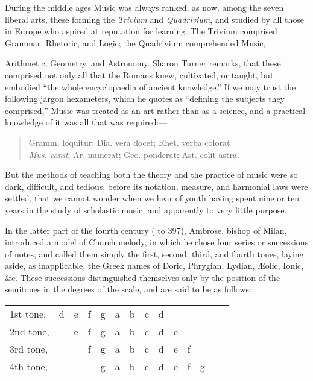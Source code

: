 

During the middle ages Music was always ranked, as now, among the seven
liberal arts, these forming the \textit{Trivium} and \textit{Quadrivium}, and studied by all
those in Europe who aspired at reputation for learning. The Trivium comprised
Grammar, Rhetoric, and Logic; the
\pagebreak
Quadrivium comprehended Music,
Arithmetic, Geometry, and Astronomy. Sharon Turner remarks, that these 
comprised not only all that the Romans knew, cultivated, or taught, but
embodied “the whole encyclopaedia of ancient knowledge.” If we may trust
the following jargon hexameters, which he quotes as “defining the subjects
they comprised,” Music was treated as an art rather than as a science, and
a practical knowledge of it was all that was required:—

\begin{quotation}
\noindent Gramm, loquitur; Dia. vera docet; Rhet. verba colorat\\
\textit{Mus. canit}; Ar. numerat; Geo. ponderat; Ast. colit astra.
\end{quotation}

But the methods of teaching both the theory and the practice of music were so
dark, difficult, and tedious, before its notation, measure, and harmonial laws were
settled, that we cannot wonder when we hear of youth having spent nine or ten
years in the study of scholastic music, and apparently to very little purpose.

In the latter part of the fourth century ( to 397), Ambrose, bishop of
Milan, introduced a model of Church melody, in which he chose four series
or successions of notes, and called them simply the first, second, third, and fourth
tones, laying aside, as inapplicable, the Greek names of Doric, Phrygian, Lydian,
Æolic, Ionic, \&c. These successions distinguished themselves only by the position
of the semitones in the degrees of the scale, and are said to be as follows:

\begin{center}
\begin{tabular}{llllllllllllll}
1st tone, & d & e & f & g & a & b & c & d \\
2nd tone, &\raisebox{1.5pt}{\rule{1em}{1pt}} & e & f & g & a & b & c & d & e \\
3rd tone, &\multicolumn{2}{c}{\raisebox{2pt}{\rule{3em}{1pt}}}& f & g & a & b & c & d & e & f \\
4th tone, &\multicolumn{3}{c}{\raisebox{2pt}{\rule{5em}{1pt}}} & g & a & b & c & d & e & f & g \\
\end{tabular}
\end{center}

